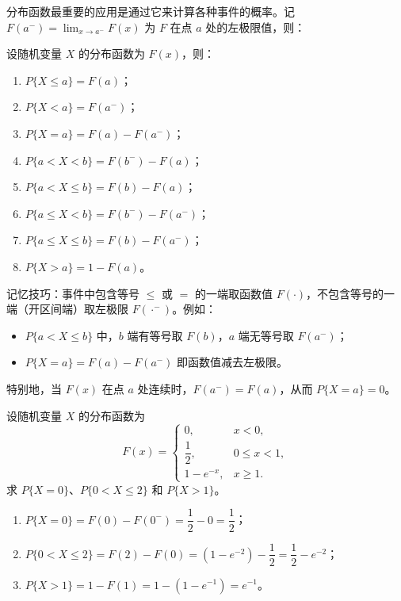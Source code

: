 \documentclass[lang=cn,11pt]{elegantbook}
\begin{document}
分布函数最重要的应用是通过它来计算各种事件的概率。记 \(F(a^-) = \lim_{x \to a^-} F(x)\) 为 \(F\) 在点 \(a\) 处的左极限值，则：

\begin{property}\label{prop:df-probability}
设随机变量 \(X\) 的分布函数为 \(F(x)\)，则：
\begin{enumerate}
    \item \(P\{X \le a\} = F(a)\)；
    \item \(P\{X < a\} = F(a^-)\)；
    \item \(P\{X = a\} = F(a) - F(a^-)\)；
    \item \(P\{a < X < b\} = F(b^-) - F(a)\)；
    \item \(P\{a < X \le b\} = F(b) - F(a)\)；
    \item \(P\{a \le X < b\} = F(b^-) - F(a^-)\)；
    \item \(P\{a \le X \le b\} = F(b) - F(a^-)\)；
    \item \(P\{X > a\} = 1 - F(a)\)。
\end{enumerate}
\end{property}

\begin{note}
记忆技巧：事件中包含等号 \(\le\) 或 \(=\) 的一端取函数值 \(F(\cdot)\)，不包含等号的一端（开区间端）取左极限 \(F(\cdot^-)\)。例如：
\begin{itemize}
    \item \(P\{a < X \le b\}\) 中，\(b\) 端有等号取 \(F(b)\)，\(a\) 端无等号取 \(F(a^-)\)；
    \item \(P\{X = a\} = F(a) - F(a^-)\) 即函数值减去左极限。
\end{itemize}
特别地，当 \(F(x)\) 在点 \(a\) 处连续时，\(F(a^-) = F(a)\)，从而 \(P\{X = a\} = 0\)。
\end{note}

\begin{exercise}\label{exer:2-1}
设随机变量 \(X\) 的分布函数为
\[
F(x) = \begin{cases}
0, & x < 0, \\
\dfrac{1}{2}, & 0 \le x < 1, \\
1 - e^{-x}, & x \ge 1.
\end{cases}
\]
求 \(P\{X = 0\}\)、\(P\{0 < X \le 2\}\) 和 \(P\{X > 1\}\)。
\end{exercise}

\begin{solution}
\begin{enumerate}
    \item \(P\{X = 0\} = F(0) - F(0^-) = \dfrac{1}{2} - 0 = \dfrac{1}{2}\)；
    \item \(P\{0 < X \le 2\} = F(2) - F(0) = (1 - e^{-2}) - \dfrac{1}{2} = \dfrac{1}{2} - e^{-2}\)；
    \item \(P\{X > 1\} = 1 - F(1) = 1 - (1 - e^{-1}) = e^{-1}\)。
\end{enumerate}
\end{solution}
\end{document}
